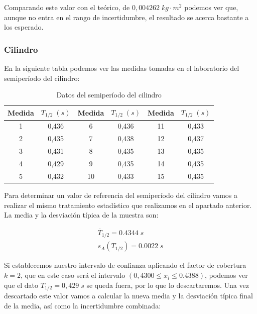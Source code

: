 \documentclass[a4paper,12pt,titlepage]{report}
\begin{document}
Comparando este valor con el teórico, de $0,004262 \; kg \cdot m^2$ podemos ver que, aunque no entra en el rango de incertidumbre, el resultado se acerca bastante a los esperado.

\subsubsection{Cilindro}

En la siguiente tabla podemos ver las medidas tomadas en el laboratorio del semiperíodo del cilindro:

\begin{table}[h!]
    \centering
    \begin{tabular}{|c|c|c|c|c|c|}
    \hline
    Medida  &  $T_{1/2} \; (s)$ & Medida   &   $T_{1/2} \; (s)$    & Medida   &   $T_{1/2} \; (s)$    \\ \hline
    1 & 0,436 & 6  & 0,436 & 11 & 0,433 \\ \hline
    2 & 0,435 & 7  & 0,438 & 12 & 0,437 \\ \hline
    3 & 0,431 & 8  & 0,435 & 13 & 0,435 \\ \hline
    4 & 0,429 & 9  & 0,435 & 14 & 0,435 \\ \hline
    5 & 0,432 & 10 & 0,433 & 15 & 0,435 \\ \hline
    \end{tabular}
    \caption{Datos del semiperíodo del cilindro}
    \label{Datos semiT cilindro}
\end{table}

Para determinar un valor de referencia del semiperíodo del cilindro vamos a realizar el mismo tratamiento estadístico que realizamos en el apartado anterior. La media y la desviación típica de la muestra son:

\begin{equation}
    \begin{gathered}
        \overline{T}_{1/2} = 0.4344 \; s\\
        s_A(T_{1/2}) = 0.0022 \; s
    \end{gathered}
\end{equation}

Si establecemos nuestro intervalo de confianza aplicando el factor de cobertura $k=2$, que en este caso será el intervalo $(0,4300 \leq x_i \leq 0.4388)$, podemos ver que el dato $T_{1/2}=0,429 \; s$ se queda fuera, por lo que lo descartaremos. Una vez descartado este valor vamos a calcular la nueva media y la desviación típica final de la media, así como la incertidumbre combinada:
\end{document}
